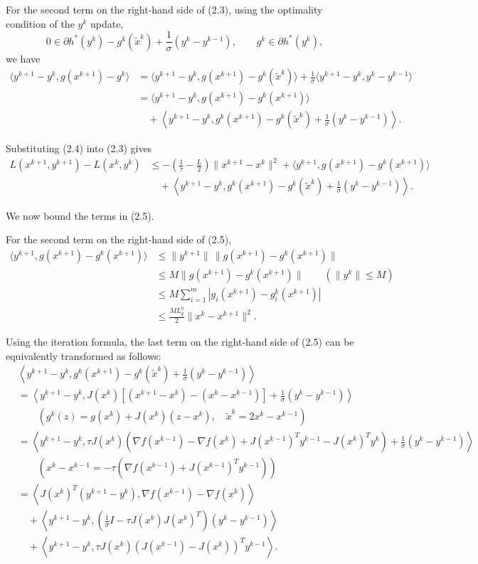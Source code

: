 \documentclass[11pt]{article}
\numberwithin{equation}{section}
\begin{document}
For the second term on the right-hand side of (2.3), using the optimality condition of the $y^k$ update,
\[
0\in\partial h^*(y^k)-g^k(\widetilde{x}^k)+\frac{1}{\sigma}(y^k-y^{k-1}),
\qquad g^k\in\partial h^*(y^k),
\]
we have
\begin{align*}
\langle y^{k+1}-y^k,g(x^{k+1})-g^k\rangle
&=\langle y^{k+1}-y^k,g(x^{k+1})-g^k(\widetilde{x}^k)\rangle
+\frac{1}{\sigma}\langle y^{k+1}-y^k,y^k-y^{k-1}\rangle\\
&=\langle y^{k+1}-y^k,g(x^{k+1})-g^k(x^{k+1})\rangle\\
&\quad+\left\langle y^{k+1}-y^k,
g^k(x^{k+1})-g^k(\widetilde{x}^k)+\frac{1}{\sigma}(y^k-y^{k-1})\right\rangle. \tag{2.4}
\end{align*}

Substituting (2.4) into (2.3) gives
\begin{align*}
L(x^{k+1},y^{k+1})-L(x^k,y^k)
&\le -\left(\frac{1}{\tau}-\frac{L}{2}\right)\|x^{k+1}-x^k\|^2
+\langle y^{k+1},g(x^{k+1})-g^k(x^{k+1})\rangle\\
&\quad+\left\langle y^{k+1}-y^k,
g^k(x^{k+1})-g^k(\widetilde{x}^k)+\frac{1}{\sigma}(y^k-y^{k-1})\right\rangle. \tag{2.5}
\end{align*}

We now bound the terms in (2.5).

For the second term on the right-hand side of (2.5),
\begin{align*}
\langle y^{k+1},g(x^{k+1})-g^k(x^{k+1})\rangle
&\le \|y^{k+1}\|\,\|g(x^{k+1})-g^k(x^{k+1})\|\\
&\le M\|g(x^{k+1})-g^k(x^{k+1})\|\qquad(\|y^k\|\le M)\\
&\le M\sum_{i=1}^m\left|g_i(x^{k+1})-g_i^k(x^{k+1})\right|\\
&\le \frac{ML_g^0}{2}\|x^k-x^{k+1}\|^2. \tag{2.6}
\end{align*}

Using the iteration formula, the last term on the right-hand side of (2.5) can be equivalently transformed as follows:
\begin{align*}
&\left\langle y^{k+1}-y^k,
g^k(x^{k+1})-g^k(\widetilde{x}^k)+\frac{1}{\sigma}(y^k-y^{k-1})\right\rangle\\
&=\left\langle y^{k+1}-y^k,
J(x^k)\left[(x^{k+1}-x^k)-(x^k-x^{k-1})\right]
+\frac{1}{\sigma}(y^k-y^{k-1})\right\rangle\\
&\qquad\left(g^k(z)=g(x^k)+J(x^k)(z-x^k),\quad \widetilde{x}^k=2x^k-x^{k-1}\right)\\
&=\left\langle y^{k+1}-y^k,
\tau J(x^k)\left(\nabla f(x^{k-1})-\nabla f(x^k)+J(x^{k-1})^Ty^{k-1}-J(x^k)^Ty^k\right)
+\frac{1}{\sigma}(y^k-y^{k-1})\right\rangle\\
&\qquad\left(x^k-x^{k-1}=-\tau\left(\nabla f(x^{k-1})+J(x^{k-1})^Ty^{k-1}\right)\right)\\
&=\left\langle J(x^k)^T(y^{k+1}-y^k),\nabla f(x^{k-1})-\nabla f(x^k)\right\rangle\\
&\quad+\left\langle y^{k+1}-y^k,
\left(\frac{1}{\sigma}I-\tau J(x^k)J(x^k)^T\right)(y^k-y^{k-1})\right\rangle\\
&\quad+\left\langle y^{k+1}-y^k,
\tau J(x^k)\left(J(x^{k-1})-J(x^k)\right)^Ty^{k-1}\right\rangle. \tag{2.7}
\end{align*}
\end{document}
